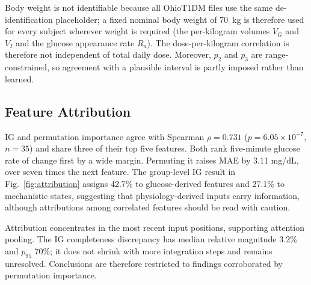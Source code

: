 \documentclass[journal]{IEEEtran}
\begin{document}
Body weight is not identifiable because all OhioT1DM files use the same de-identification placeholder; a fixed nominal body weight of 70~kg is therefore used for every subject wherever weight is required (the per-kilogram volumes $V_G$ and $V_I$ and the glucose appearance rate $R_a$). The dose-per-kilogram correlation is therefore not independent of total daily dose. Moreover, $p_2$ and $p_3$ are range-constrained, so agreement with a plausible interval is partly imposed rather than learned.

\subsection{Feature Attribution}
\label{sec:attribution}

IG and permutation importance agree with Spearman $\rho = 0.731$ ($p = 6.05 \times 10^{-7}$, $n=35$) and share three of their top five features. Both rank five-minute glucose rate of change first by a wide margin. Permuting it raises MAE by 3.11 mg/dL, over seven times the next feature. The group-level IG result in Fig.~\ref{fig:attribution} assigns 42.7\% to glucose-derived features and 27.1\% to mechanistic states, suggesting that physiology-derived inputs carry information, although attributions among correlated features should be read with caution.

Attribution concentrates in the most recent input positions, supporting attention pooling. The IG completeness discrepancy has median relative magnitude 3.2\% and $p_{95}$ 70\%; it does not shrink with more integration steps and remains unresolved. Conclusions are therefore restricted to findings corroborated by permutation importance.
\end{document}
